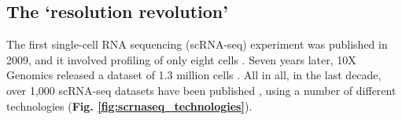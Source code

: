 
 






\subsection{The `resolution revolution'}
\label{sec:scrnaseq}

The first single-cell RNA sequencing (scRNA-seq) experiment was published in 2009, and it involved profiling of only eight cells \cite{tang2009mrna}. 
Seven years later, 10X Genomics released a dataset of 
1.3 million cells \cite{102016our}.
All in all, in the last decade, over 1,000 scRNA-seq datasets have been published 
\cite{svensson2018exponential, svensson2019curated, svensson2020single},
using a number of different technologies 
\cite{islam2011characterization, hashimshony2012cel, ramskold2012full, picelli2013smart, sasagawa2013quartz, jaitin2014massively, macosko2015highly,klein2015droplet, gierahn2017seq, zheng2017massively, hagemann2020single}
(\textbf{Fig. \ref{fig:scrnaseq_technologies}}). \\

